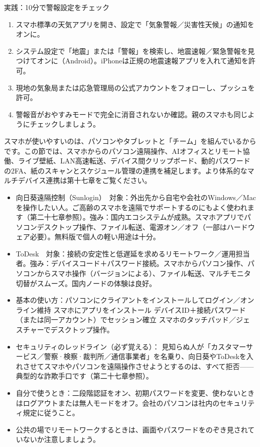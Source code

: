 \begin{tcbpractice}{実践：10分で警報設定をチェック}
\begin{enumerate}
  \item スマホ標準の天気アプリを開き、設定で「気象警報／災害性天候」の通知をオンに。
  \item システム設定で「地震」または「警報」を検索し、地震速報／緊急警報を見つけてオンに（Android）。iPhoneは正規の地震速報アプリを入れて通知を許可。
  \item 現地の気象局または応急管理局の公式アカウントをフォローし、プッシュを許可。
  \item 警報音がおやすみモードで完全に消音されないか確認。親のスマホも同じようにチェックしましょう。
\end{enumerate}

\end{tcbpractice}


スマホが使いやすいのは、パソコンやタブレットと「チーム」を組んでいるからです。この節では、スマホからのパソコン遠隔操作、AIオフィスとリモート協働、ライブ壁紙、LAN高速転送、デバイス間クリップボード、動的パスワードの2FA、紙のスキャンとスケジュール管理の連携を補足します。より体系的なマルチデバイス連携は第十七章をご覧ください。


\begin{itemize}
  \item 向日葵遠隔控制（Sunlogin）　対象：外出先から自宅や会社のWindows／Macを操作したい人。ご高齢のスマホを遠隔でサポートするのにもよく使われます（第二十七章参照）。強み：国内エコシステムが成熟。スマホアプリでパソコンデスクトップ操作、ファイル転送、電源オン／オフ（一部はハードウェア必要）。無料版で個人の軽い用途は十分。
  \item ToDesk　対象：接続の安定性と低遅延を求めるリモートワーク／運用担当者。強み：デバイスコード＋パスワード接続。スマホからパソコン操作、パソコンからスマホ操作（バージョンによる）、ファイル転送、マルチモニタ切替がスムーズ。国内ノードの体験は良好。
  \item 基本の使い方：パソコンにクライアントをインストールしてログイン／オンライン維持 スマホにアプリをインストール デバイスID＋接続パスワード（または同一アカウント）でセッション確立 スマホのタッチパッド／ジェスチャーでデスクトップ操作。
  \item セキュリティのレッドライン（必ず覚える）： 見知らぬ人が「カスタマーサービス／警察·検察·裁判所／通信事業者」を名乗り、向日葵やToDeskを入れさせてスマホやパソコンを遠隔操作させようとするのは、すべて拒否——典型的な詐欺手口です（第二十七章参照）。
  \item 自分で使うとき：二段階認証をオン、初期パスワードを変更、使わないときはログアウトまたは無人モードをオフ。会社のパソコンは社内のセキュリティ規定に従うこと。
  \item 公共の場でリモートワークするときは、画面やパスワードをのぞき見されていないか注意しましょう。
\end{itemize}

